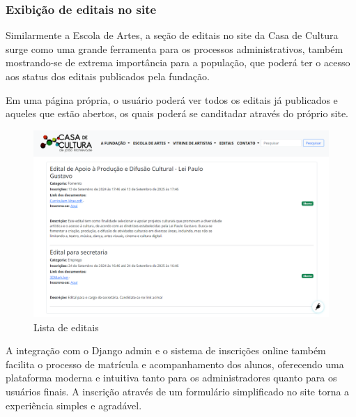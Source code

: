 \subsubsection{Exibição de editais no site}

Similarmente a Escola de Artes, a seção de editais no site da Casa de Cultura surge como uma grande ferramenta para os processos administrativos, também mostrando-se de extrema importância para a população, que poderá ter o acesso aos status dos editais publicados pela fundação.

Em uma página própria, o usuário poderá ver todos os editais já publicados e aqueles que estão abertos, os quais poderá se canditadar através do próprio site.

\begin{figure}[htb]
	\caption{\label{fig_grafico}Lista de editais}
	\begin{center}
	    \includegraphics[scale=0.35]{./img/lista_editais.png}
	\end{center}
\end{figure}

A integração com o Django admin e o sistema de inscrições online também facilita o processo de matrícula e acompanhamento dos alunos, oferecendo uma plataforma moderna e intuitiva tanto para os administradores quanto para os usuários finais. A inscrição através de um formulário simplificado no site torna a experiência simples e agradável.

